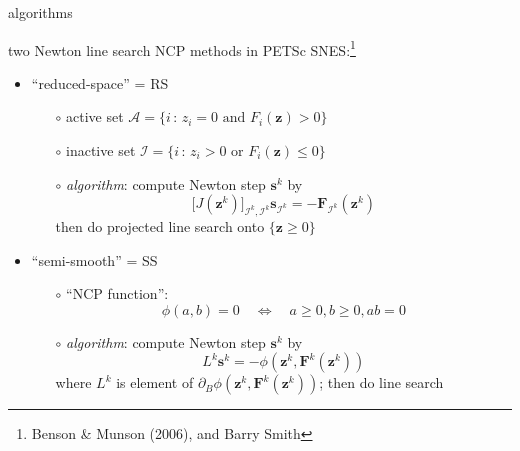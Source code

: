 \documentclass[xcolor={dvipsnames}]{beamer}
\newcommand\bq{\mathbf{q}}
\newcommand\bs{\mathbf{s}}
\newcommand\bz{\mathbf{z}}
\newcommand\bF{\mathbf{F}}
\newcommand\Div{\nabla\cdot}
\begin{document}
\begin{frame}{algorithms}

two Newton line search NCP methods in PETSc SNES:\footnote{Benson \& Munson (2006), and Barry Smith}
\begin{itemize}
\item  ``reduced-space'' = \alert{RS}
    \begin{itemize}
    \item[$\circ$] active set $\mathcal{A} = \{i \,:\, z_i = 0 \text{ and } F_i(\bz) > 0\}$
    \item[$\circ$] inactive set $\mathcal{I} = \{i \,:\, z_i > 0 \text{ or } F_i(\bz) \le 0\}$
    \item[$\circ$] \emph{algorithm}: compute Newton step $\bs^k$ by
     $$\big[J(\bz^k)\big]_{\mathcal{I}^k,\mathcal{I}^k} \bs_{\mathcal{I}^k} = - \bF_{\mathcal{I}^k}(\bz^k)$$
     then do projected line search onto $\{\bz\ge 0\}$
    \end{itemize}
\item  ``semi-smooth'' = \alert{SS}
    \begin{itemize}
    \item[$\circ$] ``NCP function'':
\vspace{-2mm}
    $$\phi(a,b)=0 \quad \iff \quad a\ge 0, b\ge 0, ab=0$$
    \item[$\circ$] \emph{algorithm}: compute Newton step $\bs^k$ by
    $$L^k \bs^k = - \phi(\bz^k,\bF^k(\bz^k))$$
    where $L^k$ is element of $\partial_B \phi(\bz^k,\bF^k(\bz^k))$; then do line search
    \end{itemize}
\end{itemize}
\end{frame}


\newcommand{\singletsmc}{\frac{h^\ell - h^{\ell-1}}{\Delta t} + \Div \bq^\ell = a^\ell}
\end{document}
